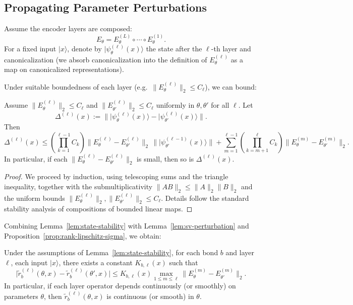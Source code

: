 \documentclass[11pt]{article}
\begin{document}
\subsection{Propagating Parameter Perturbations}

Assume the encoder layers are composed:
\[
E_\theta = E^{(L)}_\theta \circ \cdots \circ E^{(1)}_\theta.
\]
For a fixed input $\lvert x \rangle$, denote by $\lvert \psi^{(\ell)}_\theta(x)\rangle$ the state after the $\ell$-th layer and canonicalization (we absorb canonicalization into the definition of $E^{(\ell)}_\theta$ as a map on canonicalized representations).

Under suitable boundedness of each layer (e.g.\ $\|E^{(\ell)}_\theta\|_2 \le C_\ell$), we can bound:

\begin{lemma}
\label{lem:state-stability}
Assume $\|E^{(\ell)}_\theta\|_2\le C_\ell$ and $\|E^{(\ell)}_{\theta'}\|_2\le C_\ell$ uniformly in $\theta,\theta'$ for all $\ell$. Let
\[
\Delta^{(\ell)}(x)
:= \|\lvert \psi^{(\ell)}_\theta(x)\rangle - \lvert \psi^{(\ell)}_{\theta'}(x)\rangle\|.
\]
Then
\[
\Delta^{(\ell)}(x) \le 
\left(\prod_{k=1}^{\ell-1} C_k\right)
\|E^{(\ell)}_\theta - E^{(\ell)}_{\theta'}\|_2 \,\|\lvert \psi^{(\ell-1)}_{\theta'}(x)\rangle\|
+ \sum_{m=1}^{\ell-1} 
\left(\prod_{k=m+1}^{\ell} C_k\right)
\|E^{(m)}_\theta - E^{(m)}_{\theta'}\|_2.
\]
In particular, if each $\|E^{(\ell)}_\theta - E^{(\ell)}_{\theta'}\|_2$ is small, then so is $\Delta^{(\ell)}(x)$.
\end{lemma}

\begin{proof}
We proceed by induction, using telescoping sums and the triangle inequality, together with the submultiplicativity $\|AB\|_2 \le \|A\|_2 \|B\|_2$ and the uniform bounds $\|E^{(\ell)}_{\theta}\|_2,\|E^{(\ell)}_{\theta'}\|_2\le C_\ell$. Details follow the standard stability analysis of compositions of bounded linear maps.
\end{proof}

Combining Lemma~\ref{lem:state-stability} with Lemma~\ref{lem:sv-perturbation} and Proposition~\ref{prop:rank-lipschitz-sigma}, we obtain:

\begin{theorem}
\label{thm:rank-stability-parameters}
Under the assumptions of Lemma~\ref{lem:state-stability}, for each bond $b$ and layer $\ell$, each input $\lvert x \rangle$, there exists a constant $K_{b,\ell}(x)$ such that
\[
\big|\tilde{r}_b^{(\ell)}(\theta,x) - \tilde{r}_b^{(\ell)}(\theta',x)\big|
\le K_{b,\ell}(x) \max_{1\le m \le \ell} \|E^{(m)}_\theta - E^{(m)}_{\theta'}\|_2.
\]
In particular, if each layer operator depends continuously (or smoothly) on parameters $\theta$, then $\tilde{r}_b^{(\ell)}(\theta,x)$ is continuous (or smooth) in $\theta$.
\end{theorem}
\end{document}
